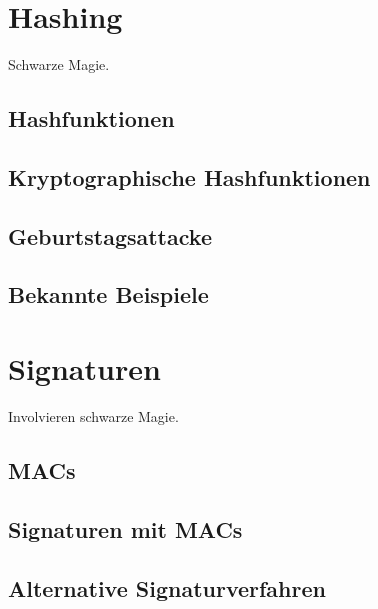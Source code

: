 \author{Autor: Vasilij Schneidermann}
\chapter{Hashing}

Schwarze Magie.

\section{Hashfunktionen}

\section{Kryptographische Hashfunktionen}

\section{Geburtstagsattacke}

\section{Bekannte Beispiele}

\author{Autor: Vasilij Schneidermann}
\chapter{Signaturen}

Involvieren schwarze Magie.

\section{\ac{MAC}s}

\section{Signaturen mit \ac{MAC}s}

\section{Alternative Signaturverfahren}
